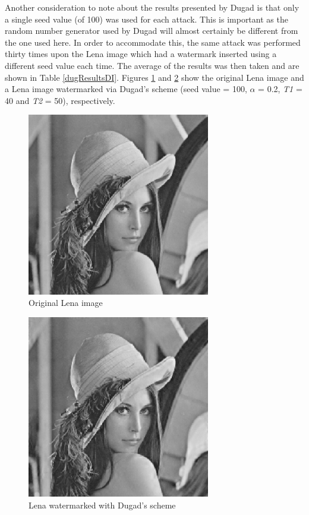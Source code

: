 \documentclass[12pt]{report}
\begin{document}
Another consideration 
to note about the results presented by Dugad is that
only a single seed value (of 100) was used 
for each attack.
This is important as the
random number generator used by Dugad will almost certainly 
be different from 
the one used here. In order to accommodate this, the same attack was performed
thirty times upon the Lena image which had a watermark inserted using a different seed value each time. The 
average of the results was then taken and are shown in Table \ref{dugResultsDI}.
Figures \ref{originalLenaDI} and \ref{lenaDugDI} show the original Lena image and a Lena image watermarked
via Dugad's scheme (seed value = 100, $\alpha$ = 0.2, \emph{T1} = 40 and \emph{T2} = 50), respectively.
\begin{figure}[p]
\setlength{\abovecaptionskip}{0.1cm}
	\begin{center}
		\includegraphics[height=8cm,width=8cm]{IM_originalLena.ps}
		\caption{Original Lena image}
		\label{originalLenaDI}
	\end{center}
\end{figure}
\begin{figure}[p]
\setlength{\abovecaptionskip}{0.1cm}
	\begin{center}
		\includegraphics[height=8cm,width=8cm]{IM_dugSeed100Lena.ps}
		\caption{Lena watermarked with Dugad's scheme}
		\label{lenaDugDI}
	\end{center}
\end{figure}
\end{document}
